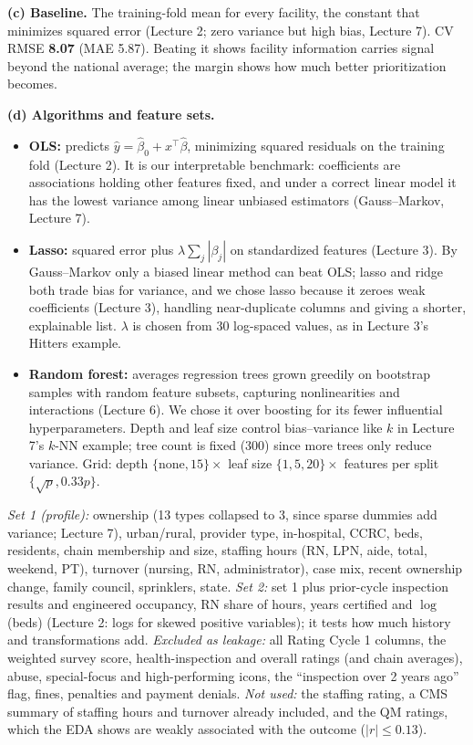 \documentclass[11pt]{article}
\begin{document}
\textbf{(c) Baseline.} The training-fold mean for every facility, the constant that minimizes squared error (Lecture 2; zero variance but high bias, Lecture 7). CV RMSE \textbf{8.07} (MAE 5.87). Beating it shows facility information carries signal beyond the national average; the margin shows how much better prioritization becomes.

\textbf{(d) Algorithms and feature sets.}
\begin{itemize}
  \item \textbf{OLS:} predicts $\hat y = \hat\beta_0 + x^\top\hat\beta$, minimizing squared residuals on the training fold (Lecture 2). It is our interpretable benchmark: coefficients are associations holding other features fixed, and under a correct linear model it has the lowest variance among linear unbiased estimators (Gauss--Markov, Lecture 7).
  \item \textbf{Lasso:} squared error plus $\lambda\sum_j|\beta_j|$ on standardized features (Lecture 3). By Gauss--Markov only a biased linear method can beat OLS; lasso and ridge both trade bias for variance, and we chose lasso because it zeroes weak coefficients (Lecture 3), handling near-duplicate columns and giving a shorter, explainable list. $\lambda$ is chosen from 30 log-spaced values, as in Lecture 3's Hitters example.
  \item \textbf{Random forest:} averages regression trees grown greedily on bootstrap samples with random feature subsets, capturing nonlinearities and interactions (Lecture 6). We chose it over boosting for its fewer influential hyperparameters. Depth and leaf size control bias--variance like $k$ in Lecture 7's $k$-NN example; tree count is fixed (300) since more trees only reduce variance. Grid: depth $\{\mathrm{none},15\}\times$ leaf size $\{1,5,20\}\times$ features per split $\{\sqrt p, 0.33p\}$.
\end{itemize}
\emph{Set 1 (profile):} ownership (13 types collapsed to 3, since sparse dummies add variance; Lecture 7), urban/rural, provider type, in-hospital, CCRC, beds, residents, chain membership and size, staffing hours (RN, LPN, aide, total, weekend, PT), turnover (nursing, RN, administrator), case mix, recent ownership change, family council, sprinklers, state.
\emph{Set 2:} set 1 plus prior-cycle inspection results and engineered occupancy, RN share of hours, years certified and $\log$(beds) (Lecture 2: logs for skewed positive variables); it tests how much history and transformations add.
\emph{Excluded as leakage:} all Rating Cycle 1 columns, the weighted survey score, health-inspection and overall ratings (and chain averages), abuse, special-focus and high-performing icons, the ``inspection over 2 years ago'' flag, fines, penalties and payment denials. \emph{Not used:} the staffing rating, a CMS summary of staffing hours and turnover already included, and the QM ratings, which the EDA shows are weakly associated with the outcome ($|r|\le 0.13$).
\end{document}
